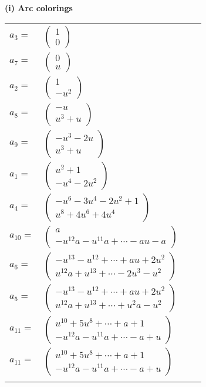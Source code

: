\documentclass[1p]{elsarticle_modified}
\theoremstyle{definition}
\begin{document}
\flushleft \textbf{(i) Arc colorings}\\
\begin{tabular}{m{7pt} m{180pt} m{7pt} m{180pt} }
\flushright $a_{3}=$&$\begin{pmatrix}1\\0\end{pmatrix}$ \\
\flushright $a_{7}=$&$\begin{pmatrix}0\\u\end{pmatrix}$ \\
\flushright $a_{2}=$&$\begin{pmatrix}1\\- u^2\end{pmatrix}$ \\
\flushright $a_{8}=$&$\begin{pmatrix}- u\\u^3+u\end{pmatrix}$ \\
\flushright $a_{9}=$&$\begin{pmatrix}- u^3-2 u\\u^3+u\end{pmatrix}$ \\
\flushright $a_{1}=$&$\begin{pmatrix}u^2+1\\- u^4-2 u^2\end{pmatrix}$ \\
\flushright $a_{4}=$&$\begin{pmatrix}- u^6-3 u^4-2 u^2+1\\u^8+4 u^6+4 u^4\end{pmatrix}$ \\
\flushright $a_{10}=$&$\begin{pmatrix}a\\- u^{12} a- u^{11} a+\cdots- a u- a\end{pmatrix}$ \\
\flushright $a_{6}=$&$\begin{pmatrix}- u^{13}- u^{12}+\cdots+a u+2 u^2\\u^{12} a+u^{13}+\cdots-2 u^3- u^2\end{pmatrix}$ \\
\flushright $a_{5}=$&$\begin{pmatrix}- u^{13}- u^{12}+\cdots+a u+2 u^2\\u^{12} a+u^{13}+\cdots+u^2 a- u^2\end{pmatrix}$ \\
\flushright $a_{11}=$&$\begin{pmatrix}u^{10}+5 u^8+\cdots+a+1\\- u^{12} a- u^{11} a+\cdots- a+u\end{pmatrix}$\\ \flushright $a_{11}=$&$\begin{pmatrix}u^{10}+5 u^8+\cdots+a+1\\- u^{12} a- u^{11} a+\cdots- a+u\end{pmatrix}$\\&\end{tabular}
\end{document}
